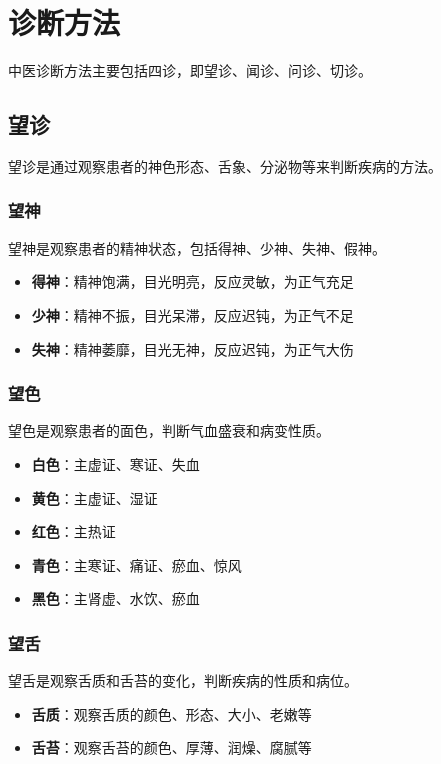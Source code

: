 \documentclass[12pt,UTF8]{ctexbook}
\begin{document}
\section{诊断方法}

中医诊断方法主要包括四诊，即望诊、闻诊、问诊、切诊。

\subsection{望诊}

望诊是通过观察患者的神色形态、舌象、分泌物等来判断疾病的方法。

\subsubsection{望神}

望神是观察患者的精神状态，包括得神、少神、失神、假神。

\begin{itemize}
\item \textbf{得神}：精神饱满，目光明亮，反应灵敏，为正气充足
\item \textbf{少神}：精神不振，目光呆滞，反应迟钝，为正气不足
\item \textbf{失神}：精神萎靡，目光无神，反应迟钝，为正气大伤
\end{itemize}

\subsubsection{望色}

望色是观察患者的面色，判断气血盛衰和病变性质。

\begin{itemize}
\item \textbf{白色}：主虚证、寒证、失血
\item \textbf{黄色}：主虚证、湿证
\item \textbf{红色}：主热证
\item \textbf{青色}：主寒证、痛证、瘀血、惊风
\item \textbf{黑色}：主肾虚、水饮、瘀血
\end{itemize}

\subsubsection{望舌}

望舌是观察舌质和舌苔的变化，判断疾病的性质和病位。

\begin{itemize}
\item \textbf{舌质}：观察舌质的颜色、形态、大小、老嫩等
\item \textbf{舌苔}：观察舌苔的颜色、厚薄、润燥、腐腻等
\end{itemize}
\end{document}
